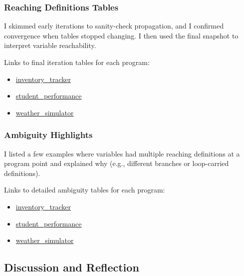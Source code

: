 \subsubsection{Reaching Definitions Tables}
I skimmed early iterations to sanity-check propagation, and I confirmed convergence when tables stopped changing. I then used the final snapshot to interpret variable reachability.

\noindent Links to final iteration tables for each program:
\begin{itemize}[itemsep=0em, topsep=0pt]
    \item \href{https://github.com/ShardulJunagade/cs202-stt/tree/main/lab7/output/inventory_tracker/reaching_definitions_iterations.md}{inventory\_tracker}
    \item \href{https://github.com/ShardulJunagade/cs202-stt/tree/main/lab7/output/student_performance/reaching_definitions_iterations.md}{student\_performance}
    \item \href{https://github.com/ShardulJunagade/cs202-stt/tree/main/lab7/output/weather_simulator/reaching_definitions_iterations.md}{weather\_simulator}
\end{itemize}

\subsubsection{Ambiguity Highlights}
I listed a few examples where variables had multiple reaching definitions at a program point and explained why (e.g., different branches or loop-carried definitions).

\noindent Links to detailed ambiguity tables for each program:
\begin{itemize}[itemsep=0em, topsep=0pt]
    \item \href{https://github.com/ShardulJunagade/cs202-stt/tree/main/lab7/output/inventory_tracker/ambiguity.md}{inventory\_tracker}
    \item \href{https://github.com/ShardulJunagade/cs202-stt/tree/main/lab7/output/student_performance/ambiguity.md}{student\_performance}
    \item \href{https://github.com/ShardulJunagade/cs202-stt/tree/main/lab7/output/weather_simulator/ambiguity.md}{weather\_simulator}
\end{itemize}

\subsection{Discussion and Reflection}

